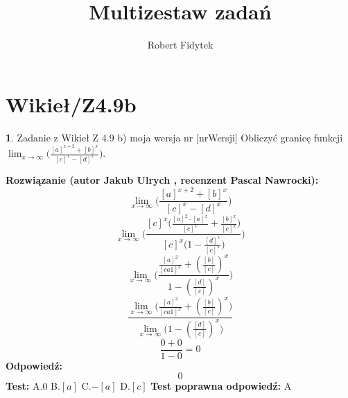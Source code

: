 \documentclass[12pt, a4paper]{article}
\title{Multizestaw zadań}
\author{Robert Fidytek}
\date{}
\theoremstyle{definition} %
\newtheorem{zad}{}
\newcommand{\kategoria}[1]{\section{#1}} %
\newcommand{\zadStart}[1]{\begin{zad}#1\newline} %
\newcommand{\zadStop}{\end{zad}}   %
\newcommand{\rozwStart}[2]{\noindent \textbf{Rozwiązanie (autor #1 , recenzent #2): }\newline} %
\newcommand{\rozwStop}{\newline}                                            %
\newcommand{\odpStart}{\noindent \textbf{Odpowiedź:}\newline}    %
\newcommand{\odpStop}{\newline}                                             %
\newcommand{\testStart}{\noindent \textbf{Test:}\newline} %
\newcommand{\testStop}{\newline} %
\newcommand{\kluczStart}{\noindent \textbf{Test poprawna odpowiedź:}\newline} %
\newcommand{\kluczStop}{\newline} %
\begin{document}
\maketitle


\kategoria{Wikieł/Z4.9b}
\zadStart{Zadanie z Wikieł Z 4.9 b) moja wersja nr [nrWersji]}
Obliczyć granicę funkcji $\lim_{x \to \infty}\bigg(\frac{[a]^{x+2}+[b]^{x}}{[c]^{x}-[d]^{x}}\bigg)$.
\zadStop
\rozwStart{Jakub Ulrych}{Pascal Nawrocki}
$$\lim_{x \to \infty}\bigg(\frac{[a]^{x+2}+[b]^{x}}{[c]^{x}-[d]^{x}}\bigg)$$
$$\lim_{x \to \infty}\bigg(\frac{[c]^{x}\big(\frac{[a]^{2}\cdot[a]^{x}}{[c]^{x}}+\frac{[b]^{x}}{[c]^{x}}\big)}{[c]^{x}\big(1-\frac{[d]^{x}}{[c]^{x}}\big)}\bigg)$$
$$\lim_{x \to \infty}\bigg(\frac{\frac{[a]^{2}}{[ca1]^{x}}+(\frac{[b]}{[c]})^{x}}{1-(\frac{[d]}{[c]})^{x}}\bigg)$$
$$\frac{\lim_{x \to \infty}\big(\frac{[a]^{2}}{[ca1]^{x}}+(\frac{[b]}{[c]})^{x}\big)}{\lim_{x \to \infty}\big(1-(\frac{[d]}{[c]})^{x}\big)}$$
$$\frac{0+0}{1-0}=0$$
\rozwStop
\odpStart
$$0$$
\odpStop
\testStart
A.$0$
B.$[a]$
C.$-[a]$
D.$[c]$
\testStop
\kluczStart
A
\kluczStop
\end{document}
